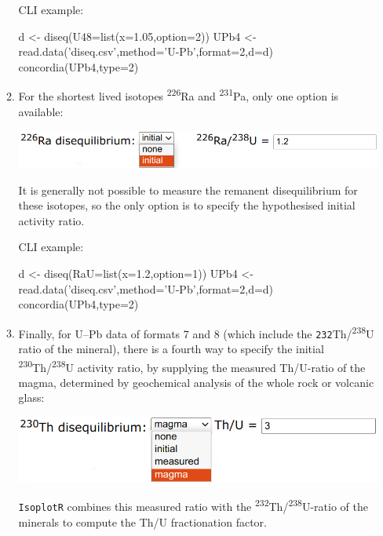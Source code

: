 \begin{refsection}
\begin{enumerate}
\begin{enumerate}
\noindent CLI example:
\begin{script}
d <- diseq(U48=list(x=1.05,option=2))
UPb4 <- read.data('diseq.csv',method='U-Pb',format=2,d=d)
concordia(UPb4,type=2)
\end{script}

\item For the shortest lived isotopes \textsuperscript{226}Ra and
  \textsuperscript{231}Pa, only one option is available:
  
\noindent\begin{minipage}[t]{.6\linewidth}
  \strut\vspace*{-\baselineskip}\newline
  \includegraphics[width=\linewidth]{../figures/Ra226-disequilibrium.png}
\end{minipage}
\begin{minipage}[t]{.4\linewidth}
It is generally not possible to measure the remanent disequilibrium
for these isotopes, so the only option is to specify the hypothesised
initial activity ratio.
\end{minipage}

\noindent CLI example:
\begin{script}
d <- diseq(RaU=list(x=1.2,option=1))
UPb4 <- read.data('diseq.csv',method='U-Pb',format=2,d=d)
concordia(UPb4,type=2)
\end{script}

\item Finally, for U--Pb data of formats 7 and 8 (which include the
  \texttt{232}Th/\textsuperscript{238}U ratio of the mineral), there
  is a fourth way to specify the initial
  \textsuperscript{230}Th/\textsuperscript{238}U activity ratio, by
  supplying the measured Th/U-ratio of the magma, determined by
  geochemical analysis of the whole rock or volcanic glass:

\noindent\begin{minipage}[t]{.6\linewidth}
    \strut\vspace*{-\baselineskip}\newline
    \includegraphics[width=\linewidth]{../figures/Th230-disequilibrium.png}
  \end{minipage}
  \begin{minipage}[t]{.4\linewidth}
    \texttt{IsoplotR} combines this measured ratio with the
    \textsuperscript{232}Th/\textsuperscript{238}U-ratio of the
    minerals to compute the Th/U fractionation factor.
  \end{minipage}


\end{enumerate}
\end{enumerate}
\end{refsection}

